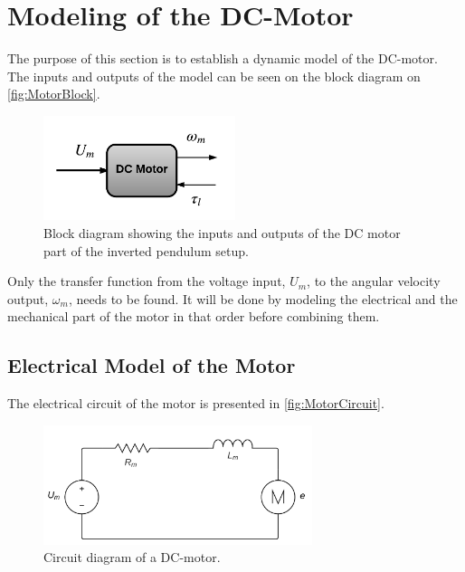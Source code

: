 \section{Modeling of the DC-Motor}
\label{sec:ModelDCMotor}
The purpose of this section is to establish a dynamic model of the DC-motor. The inputs and outputs of the model can be seen on the block diagram on \autoref{fig:MotorBlock}.
\begin{figure}[htbp]
\centering
\includegraphics[width=0.5\textwidth]{figures/modeling/Motor/InputOutputMotor.pdf}
\caption{Block diagram showing the inputs and outputs of the DC motor part of the inverted pendulum setup.}
\label{fig:MotorBlock}
\end{figure}

Only the transfer function from the voltage input, $U_m$, to the angular velocity output, $\omega_m$, needs to be found. It will be done by modeling the electrical and the mechanical part of the motor in that order before combining them.

\subsection{Electrical Model of the Motor}
The electrical circuit of the motor is presented in \autoref{fig:MotorCircuit}.
\begin{figure}[htbp]
	\centering
 	\includegraphics[width=0.7\textwidth]{figures/modeling/Motor/MotorElectricCircuit.pdf} 
 	\caption{Circuit diagram of a DC-motor.}
 	\label{fig:MotorCircuit}
\end{figure}

